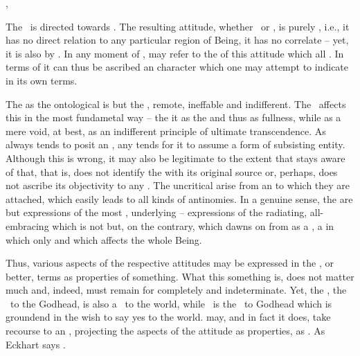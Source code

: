 \sep

\pa\label{GodheadGod} The \sch\ is directed towards .  The
resulting attitude, whether \yes\ or \No, is purely ,
i.e., it has no direct relation to any particular region of Being, it
has no  correlate%
--
yet, it is also  by .
In any  moment of ,
 may refer to the  of this attitude
which  all .  In terms of 
it can thus be ascribed an  character which one may
attempt to indicate in its own terms.

The  as the ontological  is but 
the  , remote, ineffable and indifferent. 
The \sch\ affects this  in the most fundametal way -- the
  it as the  and thus as fullness,
while  as a mere void, at best, as an 
indifferent principle of ultimate transcendence.  As  
always tends to posit an , any 
 tends for it to assume 
a form of subsisting entity. Although this is wrong, it may also be legitimate 
to the extent that  stays aware of that, that is, does 
not identify the   with its original source 
or, perhaps, does not ascribe its {objectivity} to any . 
%
The uncritical  arise from  an 
to which they are attached, which easily leads to all kinds of 
antinomies.  In a genuine sense, the
 are but expressions of the most 
, underlying  -- 
 expressions of the radiating, all-embracing  
which is not  but, on the contrary, which dawns on  
from  as a , a  in which  
only  and which affects the whole Being.

\pa Thus, various aspects of the respective attitudes may be expressed
in the , or better,  terms as
properties of something.  What this something is, does not matter much
and, indeed, must remain for  completely
 and indeterminate.  Yet, the \yes, the \yes\ to the
 Godhead, is also a \yes\ to the world, while \No\ is
the \No\ to Godhead which is groundend in the wish to say yes to the
world.   may, and in fact it does, take recourse to an
, projecting the aspects of the
 attitude as properties, as .  As Eckhart
says .

